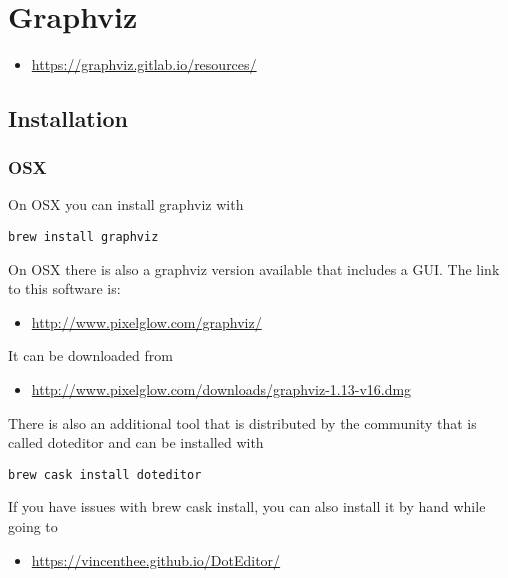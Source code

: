 \MDNAME\

\section{Graphviz}

\begin{itemize}
\item
  \url{https://graphviz.gitlab.io/resources/}
\end{itemize}

\subsection{Installation}

\subsubsection{OSX}

On OSX you can install graphviz with

\begin{lstlisting}
brew install graphviz
\end{lstlisting}

On OSX there is also a graphviz version available that includes a GUI.
The link to this software is:

\begin{itemize}
\item
  \url{http://www.pixelglow.com/graphviz/}
\end{itemize}

It can be downloaded from

\begin{itemize}
\item
  \url{http://www.pixelglow.com/downloads/graphviz-1.13-v16.dmg}
\end{itemize}

There is also an additional tool that is distributed by the community
that is called doteditor and can be installed with

\begin{lstlisting}
brew cask install doteditor
\end{lstlisting}

If you have issues with brew cask install, you can also install it by
hand while going to

\begin{itemize}
\item
  \url{https://vincenthee.github.io/DotEditor/}
\end{itemize}

